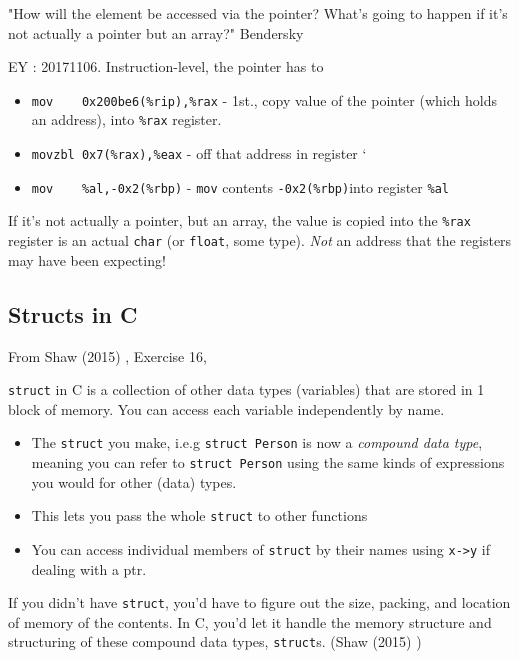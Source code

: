 \documentclass[10pt]{amsart}
\begin{document}
\begin{multicols*}{2}
"How will the element be accessed via the pointer?  What's going to happen if it's not actually a pointer but an array?"  Bendersky \cite{Bend}   

EY : 20171106.  Instruction-level, the pointer has to     
\begin{itemize}
	\item \verb|mov    0x200be6(%rip),%rax| - 1st., copy value of the pointer (which holds an address), into \verb|%rax| register.  
	\item \verb|movzbl 0x7(%rax),%eax| - off that address in register `%
	\item \verb|mov    %al,-0x2(%rbp)| - \verb|mov| contents \verb|-0x2(%rbp)|into register \verb|%al|
\end{itemize}

If it's not actually a pointer, but an array, the value is copied into the \verb|%rax| register is an actual \verb|char| (or \verb|float|, some type).  \emph{Not} an address that the registers may have been expecting!  


\subsection{Structs in C}
From Shaw (2015) \cite{Shaw2015}, Exercise 16, 

\verb|struct| in C is a collection of other data types (variables) that are stored in 1 block of memory.  You can access each variable independently by name.  

\begin{itemize}
	\item The \verb|struct| you make, i.e.g \verb|struct Person| is now a \emph{compound data type}, meaning you can refer to \verb|struct Person| using the same kinds of expressions you would for other (data) types.
	\item This lets you pass the whole \verb|struct| to other functions
	\item You can access individual members of \verb|struct| by their names using \verb|x->y| if dealing with a ptr.  
\end{itemize}  

If you didn't have \verb|struct|, you'd have to figure out the size, packing, and location of memory of the contents.  In C, you'd let it handle the memory structure and structuring of these compound data types, \verb|struct|s.  (Shaw (2015) \cite{Shaw2015})




\end{multicols*}
\end{document}
